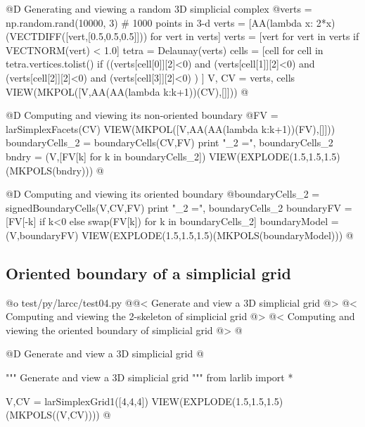 \documentclass[11pt,oneside]{article}	%
\begin{document}
@D Generating and viewing a random 3D simplicial complex
@{verts = np.random.rand(10000, 3) # 1000 points in 3-d
verts = [AA(lambda x: 2*x)(VECTDIFF([vert,[0.5,0.5,0.5]])) for vert in verts]
verts = [vert for vert in verts if VECTNORM(vert) < 1.0]
tetra = Delaunay(verts)
cells = [cell for cell in tetra.vertices.tolist()
		 if  ((verts[cell[0]][2]<0) and (verts[cell[1]][2]<0) 
		 		and (verts[cell[2]][2]<0) and (verts[cell[3]][2]<0) ) ]
V, CV = verts, cells
VIEW(MKPOL([V,AA(AA(lambda k:k+1))(CV),[]]))
@}

@D Computing and viewing its non-oriented boundary 
@{FV = larSimplexFacets(CV)
VIEW(MKPOL([V,AA(AA(lambda k:k+1))(FV),[]]))
boundaryCells_2 = boundaryCells(CV,FV)
print "\nboundaryCells_2 =\n", boundaryCells_2
bndry = (V,[FV[k] for k in boundaryCells_2])
VIEW(EXPLODE(1.5,1.5,1.5)(MKPOLS(bndry)))
@}

@D Computing and viewing its oriented boundary
@{boundaryCells_2 = signedBoundaryCells(V,CV,FV)
print "\nboundaryCells_2 =\n", boundaryCells_2
boundaryFV = [FV[-k] if k<0 else swap(FV[k]) for k in boundaryCells_2]
boundaryModel = (V,boundaryFV)
VIEW(EXPLODE(1.5,1.5,1.5)(MKPOLS(boundaryModel)))
@}

\subsection{Oriented boundary of a simplicial grid}

@o test/py/larcc/test04.py
@{@< Generate and view a 3D simplicial grid @>
@< Computing and viewing the 2-skeleton of simplicial grid @>
@< Computing and viewing the oriented boundary of simplicial grid @>
@}


@D Generate and view a 3D simplicial grid
@{""" Generate and view a 3D simplicial grid """
from larlib import *

V,CV = larSimplexGrid1([4,4,4])
VIEW(EXPLODE(1.5,1.5,1.5)(MKPOLS((V,CV))))
@}
\end{document}
